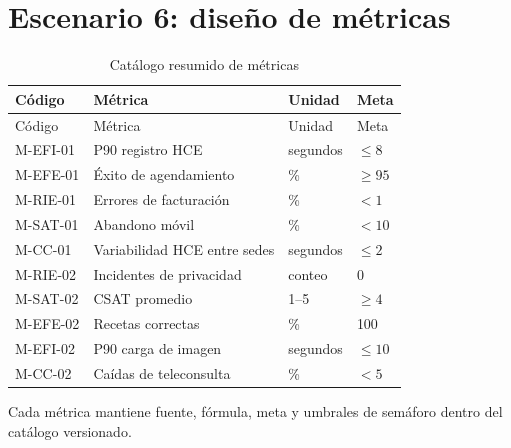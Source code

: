 \chapter{Escenario 6: diseño de métricas}

\begin{longtable}{llll}
\caption{Catálogo resumido de métricas}\\\toprule
Código & Métrica & Unidad & Meta\\\midrule\endfirsthead
\toprule Código & Métrica & Unidad & Meta\\\midrule\endhead
M-EFI-01 & P90 registro HCE & segundos & $\leq 8$\\
M-EFE-01 & Éxito de agendamiento & \% & $\geq 95$\\
M-RIE-01 & Errores de facturación & \% & $<1$\\
M-SAT-01 & Abandono móvil & \% & $<10$\\
M-CC-01 & Variabilidad HCE entre sedes & segundos & $\leq 2$\\
M-RIE-02 & Incidentes de privacidad & conteo & 0\\
M-SAT-02 & CSAT promedio & 1--5 & $\geq 4$\\
M-EFE-02 & Recetas correctas & \% & 100\\
M-EFI-02 & P90 carga de imagen & segundos & $\leq 10$\\
M-CC-02 & Caídas de teleconsulta & \% & $<5$\\\bottomrule
\end{longtable}

Cada métrica mantiene fuente, fórmula, meta y umbrales de semáforo dentro del catálogo versionado.
